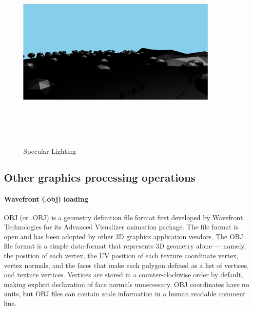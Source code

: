 \documentclass{report}
\begin{document}
    \medskip
    \begin{figure}[h!]
      \centering
        \includegraphics[width=10cm,height=10cm,keepaspectratio]{specular.png}
        \caption{Specular Lighting}
    \end{figure}
\subsection{Other graphics processing operations}
    \paragraph{Wavefront (.obj) loading}
    OBJ (or .OBJ) is a geometry definition file format first developed by Wavefront Technologies 
    for its Advanced Visualizer animation package. The file format is open and has been adopted by other 
    3D graphics application vendors.
    The OBJ file format is a simple data-format that represents 3D geometry alone — namely, the position of 
    each vertex, the UV position of each texture coordinate vertex, vertex normals, and the faces that 
    make each polygon defined as a list of vertices, and texture vertices. Vertices are stored in a 
    counter-clockwise order by default, making explicit declaration of face normals unnecessary. OBJ 
    coordinates have no units, but OBJ files can contain scale information in a human readable comment 
    line. 
\end{document}
